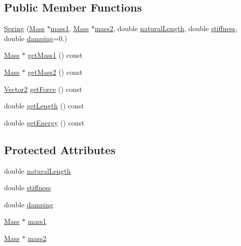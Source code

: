 \subsection*{Public Member Functions}
\begin{DoxyCompactItemize}
\item 
\hyperlink{classSpring_aa200d0ef9f53cf415c564e711079a5d9}{Spring} (\hyperlink{classMass}{Mass} $\ast$\hyperlink{classSpring_ab89136b001acfb27f95271781651c7f2}{mass1}, \hyperlink{classMass}{Mass} $\ast$\hyperlink{classSpring_af687f55d26b9799e7d7348104843855c}{mass2}, double \hyperlink{classSpring_a2b0a17c4655fda4b082289f5ff867197}{natural\+Length}, double \hyperlink{classSpring_aed22a149191c40dcef27af3e029e60fd}{stiffness}, double \hyperlink{classSpring_a3f82602a9f227c354d537fbf6c0344ec}{damping}=0.)
\item 
\hyperlink{classMass}{Mass} $\ast$ \hyperlink{classSpring_af5b4786fc1829f556755c390a7c461bc}{get\+Mass1} () const
\item 
\hyperlink{classMass}{Mass} $\ast$ \hyperlink{classSpring_abcb4acf6d6f01eeff3b20c59674c05d3}{get\+Mass2} () const
\item 
\hyperlink{classVector2}{Vector2} \hyperlink{classSpring_a9b4eb2edf28f7d03f5acc7f8d276207f}{get\+Force} () const
\item 
double \hyperlink{classSpring_abac33a6e28978c4b09cee7f4709b9387}{get\+Length} () const
\item 
double \hyperlink{classSpring_a58ef4f35d8a552adb76662b4d7615741}{get\+Energy} () const
\end{DoxyCompactItemize}
\subsection*{Protected Attributes}
\begin{DoxyCompactItemize}
\item 
double \hyperlink{classSpring_a2b0a17c4655fda4b082289f5ff867197}{natural\+Length}
\item 
double \hyperlink{classSpring_aed22a149191c40dcef27af3e029e60fd}{stiffness}
\item 
double \hyperlink{classSpring_a3f82602a9f227c354d537fbf6c0344ec}{damping}
\item 
\hyperlink{classMass}{Mass} $\ast$ \hyperlink{classSpring_ab89136b001acfb27f95271781651c7f2}{mass1}
\item 
\hyperlink{classMass}{Mass} $\ast$ \hyperlink{classSpring_af687f55d26b9799e7d7348104843855c}{mass2}
\end{DoxyCompactItemize}


